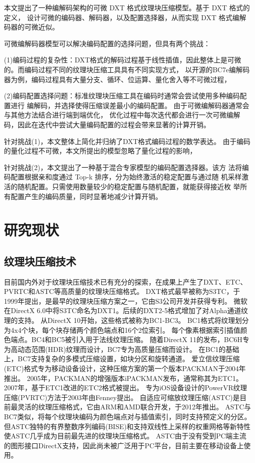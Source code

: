 本文提出了一种编解码架构的可微 DXT 格式纹理块压缩模型。基于 DXT 格式的定义，
设计可微的编码器、解码器，以及配置选择器，从而实现 DXT 格式编解码器的可微近似。

可微编解码器模型可以解决编码配置的选择问题，但具有两个挑战：

(1)编码过程的复杂性：DXT格式的解码过程基于线性插值，因此整体上是可微的。而编码过程不同的纹理块压缩工具具有不同实现方式，
以开源的BC7e编解码器为例，编码过程具有大量分支、循环、位运算、量化舍入等不可微过程，

(2)编码配置选择问题：标准纹理块压缩工具在编码时通常会尝试使用多种编码配置进行
编解码，并选择使得压缩误差最小的编码配置。
由于可微编解码器通常会与其他方法结合进行端到端优化，
优化过程中每次迭代都会进行一次可微编解码，因此在迭代中尝试大量编码配置的过程会带来显著的计算开销。

针对挑战(1)，本文整体上简化并归纳了DXT格式编码过程的数学表达。
由于编码的量化过程不可微，本文所提出的模型忽略了量化过程的影响，

针对挑战(2)，本文提出了一种基于混合专家模型的编码配置选择器。该方
法将编码配置根据亲和度通过 Top-k 排序，分为始终激活的稳定配置与通过随
机采样激活的随机配置。只需使用数量较少的稳定配置与随机配置，就能获得接近枚
举所有配置产生的编码质量，同时显著地减少计算开销。

\section{研究现状}

\subsection{纹理块压缩技术}
目前国内外对于纹理块压缩技术已有充分的探索，在成果上产生了DXT、ETC、PVRTC和ASTC等高质量的纹理块压缩格式。
DXT格式最早被称为S3TC\cite{iourcha1999system}，于1999年提出，是最早的纹理块压缩方案之一，它由S3公司开发并获得专利。
微软在DirectX 6.0中将S3TC命名为DXT1。后续的DXT2-5格式增加了对Alpha通道纹理的支持。
从DirectX 10开始，这些格式被称为BC1-BC3。
BC1格式将纹理划分为4x4个块，每个块存储两个颜色端点和16个2位索引。
每个像素根据索引插值颜色端点。BC4和BC5被引入用于法线纹理压缩。
随着DirectX 11的发布，BC6H专为高动态范围(HDR)纹理而设计，BC7专为高质量压缩而设计。
在BC1的基础上，BC7支持复杂的多模式压缩设置，如块分区和旋转通道。
爱立信纹理压缩(ETC)格式专为移动设备设计，这种压缩方案的第一个版本PACKMAN\cite{strom2004packman}于2004年推出。
2005年，PACKMAN的增强版本iPACKMAN\cite{strom2005packman}发布，通常称其为ETC1。
2007年，基于ETC1改进的ETC2\cite{strom2007etc}格式被提出。
专为iOS设备设计的PowerVR纹理压缩(PVRTC)方法于2003年由Fenney\cite{fenney2003texture}提出。
自适应可缩放纹理压缩(ASTC)\cite{nystad2012adaptive}是目前最灵活的纹理压缩格式，它由ARM和AMD联合开发，于2012年推出。
ASTC与BC7类似，将每个纹理块编码为颜色端点对与插值索引，同时支持预定义的分区。
但ASTC独特的有界整数序列编码(BISE)和支持双线性上采样的权重网格等新特性使ASTC几乎成为目前最先进的纹理块压缩格式。
ASTC由于没有受到PC端主流的图形接口DirectX支持，因此尚未被广泛用于PC平台，目前主要在移动设备上使用\cite{vaidyanathan2023random}。


